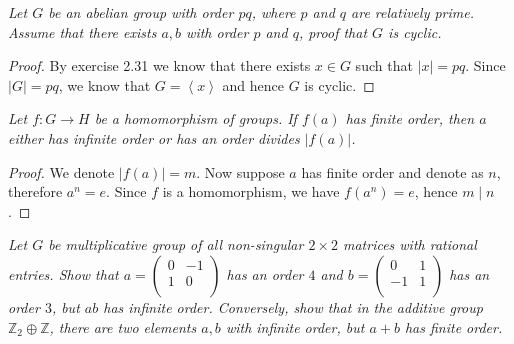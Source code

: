 \begin{problem}\em
Let $G$ be an abelian group with order $pq$, where $p$ and $q$ are relatively prime. Assume that there exists $a,b$ with order $p$ and $q$, proof that $G$ is cyclic.
\end{problem}
\begin{proof}
By exercise 2.31 we know that there exists $x\in G$ such that $|x|=pq$. Since $|G|=pq$, we know that $G=\left<x\right>$ and hence $G$ is cyclic.
\end{proof}
\begin{problem}\em
Let $f:G\to H$ be a homomorphism of groups. If $f(a)$ has finite order, then $a$ either has infinite order or has an order divides $|f(a)|$.
\end{problem}
\begin{proof}
We denote $|f(a)|=m$. Now suppose $a$ has finite order and denote as $n$, therefore $a^n=e$. Since $f$ is a homomorphism, we have $f(a^n)=e$, hence $m\mid n$.
\end{proof}
\begin{problem}\em
Let $G$ be multiplicative group of all non-singular $2\times 2$ matrices with rational entries. Show that $
a=\left( \begin{matrix}
	0&		-1\\
	1&		0\\
\end{matrix} \right) 
$ has an order $4$ and $
b=\left( \begin{matrix}
	0&		1\\
	-1&		1\\
\end{matrix} \right) 
$ has an order $3$, but $ab$ has infinite order. Conversely, show that in the additive group $\mathbb{Z}_2\oplus\mathbb{Z}$, there are two elements $a,b$ with infinite order, but $a+b$ has finite order.
\end{problem}
